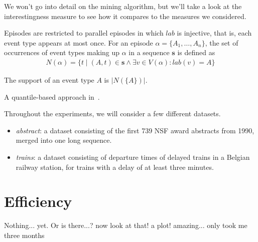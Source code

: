 We won't go into detail on the mining algorithm, but we'll take a look at the interestingness measure to see how it compares to the measures we considered.

Episodes are restricted to parallel episodes in which $ lab $ is injective, that is, each event type appears at most once. For an episode $ \alpha = \{ A_1, \ldots, A_n \} $, the set of occurrences of event types making up $ \alpha $ in a sequence $ \boldsymbol{s} $ is defined as
\begin{align*}
N(\alpha) = \{ t \mid (A, t) \in \boldsymbol{s} \wedge \exists v \in V(\alpha): lab(v) = A \}
\end{align*}

The support of an event type $ A $ is $ | N(\{ A \}) | $.



A quantile-based approach in~\citep{feremans2018mining}.

Throughout the experiments, we will consider a few different datasets.

\begin{itemize}
\item \emph{abstract}: a dataset consisting of the first 739 NSF award abstracts from 1990, merged into one long sequence.
\item \emph{trains}: a dataset consisting of departure times of delayed trains in a Belgian railway station, for trains with a delay of at least three minutes.
\end{itemize}

\section{Efficiency}

Nothing... yet. Or is there...? now look at that! a plot! amazing... only took me three months



